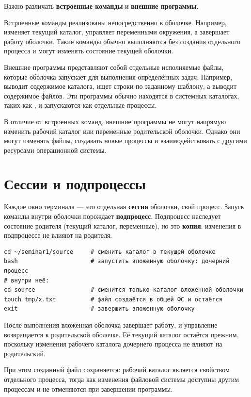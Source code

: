Важно различать \textbf{встроенные команды} и
\textbf{внешние программы}.

Встроенные команды реализованы непосредственно в оболочке.
Например,  изменяет текущий каталог, 
управляет переменными окружения, а  завершает
работу оболочки. Такие команды обычно выполняются без
создания отдельного процесса и могут изменять состояние
текущей оболочки.

Внешние программы представляют собой отдельные исполняемые
файлы, которые оболочка запускает для выполнения определённых
задач. Например,  выводит содержимое каталога,
 ищет строки по заданному шаблону, а 
выводит содержимое файлов. Эти программы обычно находятся
в системных каталогах, таких как ,
и запускаются как отдельные процессы.

В отличие от встроенных команд, внешние программы не могут
напрямую изменить рабочий каталог или переменные
родительской оболочки. Однако они могут изменять файлы,
создавать новые процессы и взаимодействовать с другими
ресурсами операционной системы.

\section{Сессии и подпроцессы}

Каждое окно терминала --- это отдельная \textbf{сессия} оболочки,
свой процесс. Запуск команды внутри оболочки порождает
\textbf{подпроцесс}. Подпроцесс наследует состояние родителя
(текущий каталог, переменные), но это \textbf{копия}: изменения
в подпроцессе не влияют на родителя.

\begin{verbatim}
cd ~/seminar1/source     # сменить каталог в текущей оболочке
bash                     # запустить вложенную оболочку: дочерний процесс
# внутри неё:
cd source                # сменится только каталог вложенной оболочки
touch tmp/x.txt          # файл создаётся в общей ФС и остаётся
exit                     # завершить вложенную оболочку
\end{verbatim}

После выполнения  вложенная оболочка завершает работу,
и управление возвращается к родительской оболочке. Её текущий
каталог остаётся прежним, поскольку изменения рабочего каталога
дочернего процесса не влияют на родительский.

При этом созданный файл сохраняется: рабочий каталог является
свойством отдельного процесса, тогда как изменения файловой
системы доступны другим процессам и не отменяются при
завершении программы.

